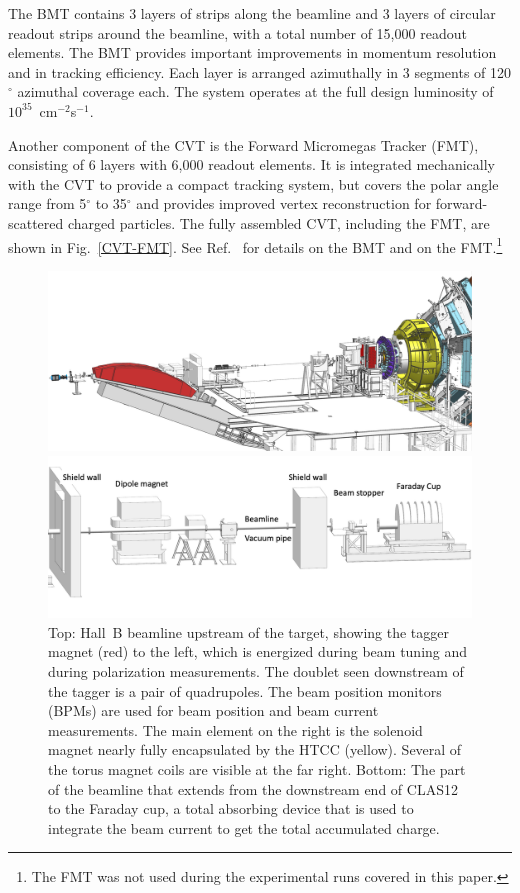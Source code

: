 \documentclass[final,3p]{elsarticle}
\begin{document}
\begin{twocolumn}
The BMT contains 3 layers of strips along the beamline and 3 layers of circular readout strips around the beamline,
with a total number of 15,000 readout elements. The BMT provides important improvements in momentum resolution
and in tracking efficiency. Each layer is arranged azimuthally in 3 segments of 120$^\circ$ azimuthal coverage each.
The system operates at the full design luminosity of $10^{35}$~cm$^{-2}$s$^{-1}$.

Another component of the CVT is the Forward Micromegas Tracker (FMT), consisting of 6 layers with 6,000 readout
elements. It  is integrated mechanically with the CVT to provide a compact tracking system, but covers the polar angle
range from 5$^\circ$ to 35$^\circ$ and provides improved vertex reconstruction for forward-scattered charged
particles. The fully assembled CVT, including the FMT, are shown in Fig.~\ref{CVT-FMT}. See Ref.~\cite{BMT} for
details on the BMT and on the FMT.\footnote{The FMT was not used during the experimental runs covered in this paper.}  

\begin{figure}[t!]
\centerline{\includegraphics[width=2.0\columnwidth]{beamline-1.png}}
\centerline{\includegraphics[width=1.3\columnwidth]{beamline-3.png}}
\caption{Top: Hall~B beamline upstream of the target, showing the tagger magnet (red) to the left, which is energized
  during beam tuning and during polarization measurements. The doublet seen downstream of the tagger is a pair of
  quadrupoles. The beam position monitors (BPMs) are used for beam position and beam current measurements. The
  main element on the right is the solenoid magnet nearly fully encapsulated by the HTCC (yellow). Several of the torus
  magnet coils are visible at the far right. Bottom: The part of the beamline that extends from the downstream end of
  CLAS12 to the Faraday cup, a total absorbing device that is used to integrate the beam current to get the total
  accumulated charge.}
\label{beamline}
\end{figure}


\end{twocolumn}
\end{document}
